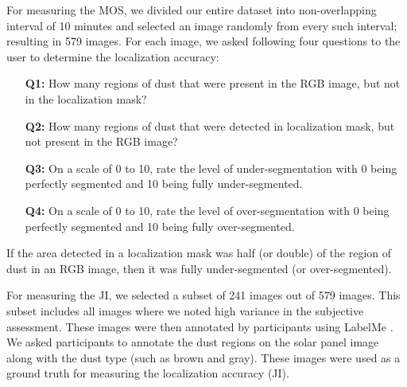 \documentclass[10pt,twocolumn,letterpaper]{article}
\begin{document}
For measuring the MOS, we divided our entire dataset into non-overlapping interval of 10 minutes and selected an image randomly from every such interval; resulting in 579 images. For each image, we asked following four questions to the user to determine the localization accuracy:
\begin{itemize}[itemsep=0pt]
\item[{\textbf{Q1:}}] How many regions of dust that were present in the RGB image, but not in the localization mask?
\item[{\textbf{Q2:}}] How many regions of dust that were detected in localization mask, but not present in the RGB image?
\item[{\textbf{Q3:}}] On a scale of 0 to 10, rate the level of under-segmentation with 0 being perfectly segmented and 10 being fully under-segmented. 
\item[{\textbf{Q4:}}] On a scale of 0 to 10, rate the level of over-segmentation with 0 being perfectly segmented and 10 being fully over-segmented.
\end{itemize}
If the area detected in a localization mask was half (or double) of the region of dust in an RGB image, then it was fully under-segmented (or over-segmented).

For measuring the JI, we selected a subset of 241 images out of 579 images. This subset includes all images where we noted high variance in the subjective assessment. These images were then annotated by participants using LabelMe \cite{Russell2008}. We asked participants to annotate the dust regions on the solar panel image along with the dust type (such as brown and gray). These images were used as a ground truth for measuring the localization accuracy (JI).

\vspace{-4mm}
\end{document}

